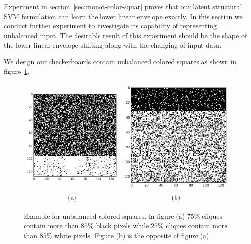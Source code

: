 Experiment in section~\ref{sec:monot-color-squar} proves that our
latent structural SVM formulation can learn the lower linear
envelope exactly. In this section we conduct further experiment
to investigate its capability of representing unbalanced input.
The desirable result of this experiment should be the shape of
the lower linear envelope shifting along with the changing of
input data.

We design our checkerboards contain unbalanced colored squares as
shown in figure~\ref{fig:unba_checkerboard}.

\begin{figure}[hb]
  \centering
  \setlength{\tabcolsep}{2pt}
  \begin{tabular}{cc}
    \includegraphics[width=0.5\columnwidth]{Part2/figures/unba_black.png}&
                                                                            \includegraphics[width=0.5\columnwidth]{Part2/figures/unba_white.png}\\
    {\small (a)} & {\small (b)} 
  \end{tabular}
  \caption{\label{fig:unba_checkerboard} Example for unbalanced
    colored squares. In figure (a) $75\%$ cliques contain more
    than $85\%$ black pixels while $25\%$ cliques contain more
    than $85\%$ white pixels. Figure (b) is the opposite of
    figure (a)}
\end{figure}

